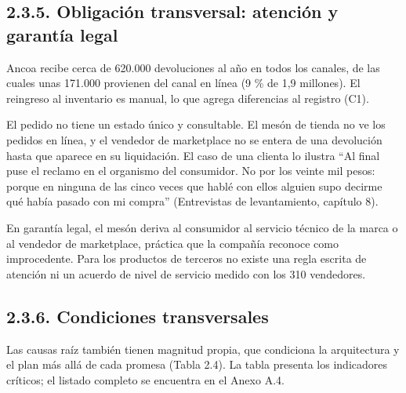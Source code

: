 \documentclass[11pt]{article}
\begin{document}
\subsection{2.3.5. Obligación transversal: atención y garantía legal}\label{obligacion-transversal-atencion-y-garantia-legal}

Ancoa recibe cerca de 620.000 devoluciones al año en todos los canales, de las cuales unas 171.000 provienen del canal en línea (9 \% de 1,9 millones). El reingreso al inventario es manual, lo que agrega diferencias al registro (C1).

El pedido no tiene un estado único y consultable. El mesón de tienda no ve los pedidos en línea, y el vendedor de marketplace no se entera de una devolución hasta que aparece en su liquidación. El caso de una clienta lo ilustra ``Al final puse el reclamo en el organismo del consumidor. No por los veinte mil pesos: porque en ninguna de las cinco veces que hablé con ellos alguien supo decirme qué había pasado con mi compra'' (Entrevistas de levantamiento, capítulo 8).

En garantía legal, el mesón deriva al consumidor al servicio técnico de la marca o al vendedor de marketplace, práctica que la compañía reconoce como improcedente. Para los productos de terceros no existe una regla escrita de atención ni un acuerdo de nivel de servicio medido con los 310 vendedores.

\subsection{2.3.6. Condiciones transversales}\label{condiciones-transversales}

Las causas raíz también tienen magnitud propia, que condiciona la arquitectura y el plan más allá de cada promesa (Tabla 2.4). La tabla presenta los indicadores críticos; el listado completo se encuentra en el Anexo A.4.
\end{document}
